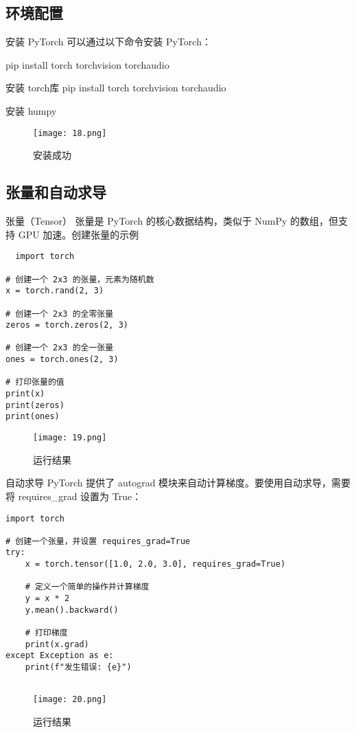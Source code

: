 \documentclass[a4paper, 12pt]{article}
\begin{document}
\subsection{环境配置}

安装 PyTorch
可以通过以下命令安装 PyTorch：

pip install torch torchvision torchaudio

安装 torch库
pip install torch torchvision torchaudio

安装 humpy
\begin{figure}[H]
  \centering
    \texttt{[image: 18.png]}
  \caption{安装成功}
   \end{figure}  

   
\subsection{张量和自动求导}
 张量（Tensor）
张量是 PyTorch 的核心数据结构，类似于 NumPy 的数组，但支持 GPU 加速。创建张量的示例
\begin{lstlisting}
  import torch

# 创建一个 2x3 的张量，元素为随机数
x = torch.rand(2, 3)

# 创建一个 2x3 的全零张量
zeros = torch.zeros(2, 3)

# 创建一个 2x3 的全一张量
ones = torch.ones(2, 3)

# 打印张量的值
print(x)
print(zeros)
print(ones)
\end{lstlisting}

\begin{figure}[H]
  \centering
    \texttt{[image: 19.png]}
  \caption{运行结果}
   \end{figure}  
   
自动求导
PyTorch 提供了 autograd 模块来自动计算梯度。要使用自动求导，需要将 requires\_grad 设置为 True：

\begin{lstlisting}
import torch

# 创建一个张量，并设置 requires_grad=True
try:
    x = torch.tensor([1.0, 2.0, 3.0], requires_grad=True)

    # 定义一个简单的操作并计算梯度
    y = x * 2
    y.mean().backward()
    
    # 打印梯度
    print(x.grad)
except Exception as e:
    print(f"发生错误: {e}")
    
\end{lstlisting}

\begin{figure}[H]
  \centering
\texttt{[image: 20.png]}
  \caption{运行结果}
   \end{figure}  
\end{document}
